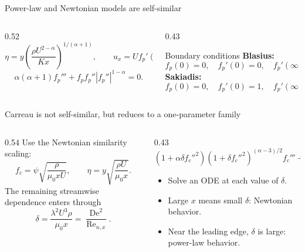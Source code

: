 \documentclass[aspectratio=169,11pt]{beamer}
\newcommand{\Reyn}{\operatorname{Re}}
\newcommand{\De}{\operatorname{De}}
\begin{document}
\begin{frame}{Power-law and Newtonian models are self-similar}
\begin{columns}[T,onlytextwidth]
\begin{column}{0.52\textwidth}
\[
  \eta = y\left(\frac{\rho U^{2-\alpha}}{Kx}\right)^{1/(\alpha+1)},
  \qquad u_x=Uf_p'(\eta;\alpha).
\]
\[
  \alpha(\alpha+1)f_p''' + f_p f_p''|f_p''|^{1-\alpha}=0.
\]
\end{column}
\begin{column}{0.43\textwidth}
\begin{block}{Boundary conditions}
\textbf{Blasius:}
\[
 f_p(0)=0,\quad f_p'(0)=0,\quad f_p'(\infty)=1.
\]
\textbf{Sakiadis:}
\[
 f_p(0)=0,\quad f_p'(0)=1,\quad f_p'(\infty)=0.
\]
\end{block}
\end{column}
\end{columns}
\end{frame}

\begin{frame}{Carreau is not self-similar, but reduces to a one-parameter family}
\begin{columns}[T,onlytextwidth]
\begin{column}{0.54\textwidth}
Use the Newtonian similarity scaling:
\[
  f_c=\psi\sqrt{\frac{\rho}{\mu_0 xU}},
  \qquad
  \eta = y\sqrt{\frac{\rho U}{\mu_0 x}}.
\]
The remaining streamwise dependence enters through
\[
  \delta = \frac{\lambda^2U^3\rho}{\mu_0x}
  =\frac{\De^2}{\Reyn_{n,x}}.
\]
\end{column}
\begin{column}{0.43\textwidth}
\[
\left(1+\alpha\delta f_c''^2\right)
\left(1+\delta f_c''^2\right)^{(\alpha-3)/2}f_c'''
+\frac{1}{2}f_cf_c''=0.
\]
\begin{itemize}
  \item Solve an ODE at each value of $\delta$.
  \item Large $x$ means small $\delta$: Newtonian behavior.
  \item Near the leading edge, $\delta$ is large: power-law behavior.
\end{itemize}
\end{column}
\end{columns}
\end{frame}
\end{document}
